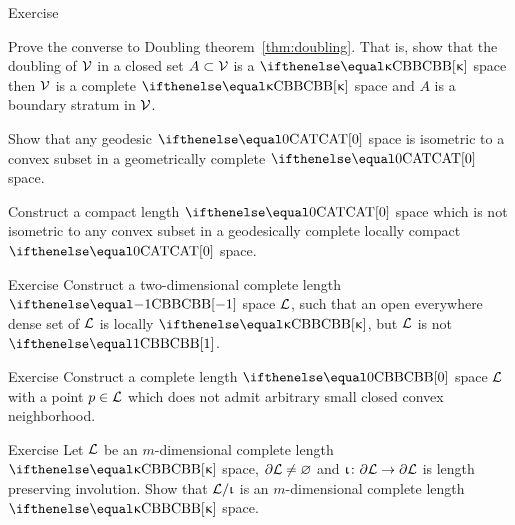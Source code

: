 \begin{thm}{Exercise}

\begin{subthm}{}
Prove the converse to Doubling theorem~\ref{thm:doubling}.
That is, 
show that the doubling of $\mathcal{V}$ 
in a closed set $A\subset \spc{V}$ 
is a $\Alex\kappa$ space 
then $\mathcal{V}$ is a complete $\Alex\kappa$ space and $A$ is a boundary stratum in $\mathcal{V}$.
\end{subthm}


\begin{subthm}{}
Show that any geodesic $\CAT{0}$ space is isometric to a convex subset in a geometrically complete $\CAT{0}$ space.
\end{subthm}

\begin{subthm}{}
Construct a compact length $\CAT0$ space 
which is not isometric to any convex subset in a geodesically complete locally compact $\CAT0$ space.
\end{subthm}

\end{thm}

\begin{thm}{Exercise}
Construct a two-dimensional complete length $\Alex{-1}$ space $\mathcal{L}$, 
such that an open everywhere dense set of $\mathcal{L}$ is locally $\Alex\kappa$, but $\mathcal{L}$ is not $\Alex1$.
\end{thm}


\begin{thm}{Exercise}\label{ex:no-convex-nbhd-CBB}
Construct a complete length $\Alex0$ space $\mathcal{L}$
with a point $p\in \spc{L}$ which does not admit arbitrary small closed convex neighborhood. 
\end{thm}


\begin{thm}{Exercise}\label{ex:nan-li}
Let $\mathcal{L}$ be an $m$-dimensional complete length $\Alex\kappa$ space, $\partial \mathcal{L}\ne \varnothing$
and $\iota\: \partial \spc{L}\to \partial \spc{L}$ is length preserving involution.
Show that $\mathcal{L}/\upiota$ is an $m$-dimensional complete length $\Alex\kappa$ space.
\end{thm}











